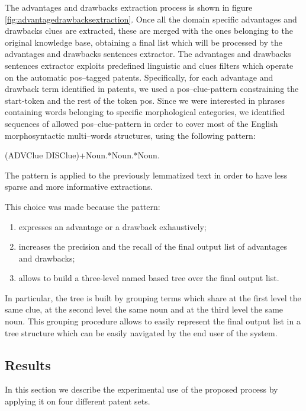 \documentclass[b5paper,]{book}
\providecommand{\tightlist}{%
  \setlength{\itemsep}{0pt}\setlength{\parskip}{0pt}}
\theoremstyle{definition}
\theoremstyle{definition}
\theoremstyle{definition}
\theoremstyle{remark}
\begin{document}
The advantages and drawbacks extraction process is shown in figure
\ref{fig:advantagedrawbacksextraction}. Once all the domain specific
advantages and drawbacks clues are extracted, these are merged with the
ones belonging to the original knowledge base, obtaining a final list
which will be processed by the advantages and drawbacks sentences
extractor. The advantages and drawbacks sentences extractor exploits
predefined linguistic and clues filters which operate on the automatic
pos--tagged patents. Specifically, for each advantage and drawback term
identified in patents, we used a pos--clue-pattern constraining the
start-token and the rest of the token pos. Since we were interested in
phrases containing words belonging to specific morphological categories,
we identified sequences of allowed pos--clue-pattern in order to cover
most of the English morphosyntactic multi--words structures, using the
following pattern:

(ADVClue\textbar{} DISClue)+Noun.*Noun.*Noun.

The pattern is applied to the previously lemmatized text in order to
have less sparse and more informative extractions.

This choice was made because the pattern:

\begin{enumerate}
\def\labelenumi{\arabic{enumi}.}
\tightlist
\item
  expresses an advantage or a drawback exhaustively;
\item
  increases the precision and the recall of the final output list of
  advantages and drawbacks;
\item
  allows to build a three-level named based tree over the final output
  list.
\end{enumerate}

In particular, the tree is built by grouping terms which share at the
first level the same clue, at the second level the same noun and at the
third level the same noun. This grouping procedure allows to easily
represent the final output list in a tree structure which can be easily
navigated by the end user of the system.

\subsection{Results}\label{results-1}

In this section we describe the experimental use of the proposed process
by applying it on four different patent sets.
\end{document}
